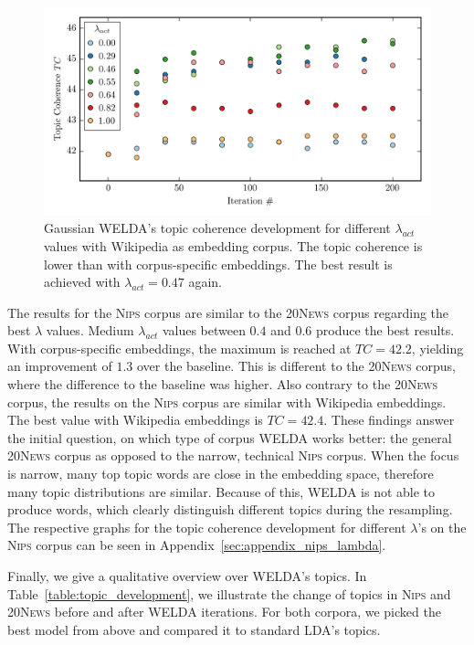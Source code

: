 \documentclass[
        a4paper,
        titlepage,
        twoside,
        parskip,
        numbers=noenddot
        ]{scrbook}
\theoremstyle{break}
\begin{document}
\begin{figure}
       \centering
       \includegraphics[width=\textwidth]{figures/welda_gaussian_lambda_200.png}
       \caption{Gaussian WELDA's topic coherence development for different $\lambda_{act}$ values with Wikipedia as embedding corpus. The topic coherence is lower than with corpus-specific embeddings. The best result is achieved with $\lambda_{act} = 0.47$ again.}
       \label{fig:welda_gaussian_lambda_200}
\end{figure}

The results for the \textsc{Nips} corpus are similar to the \textsc{20News} corpus regarding the best $\lambda$ values.
Medium $\lambda_{act}$ values between $0.4$ and $0.6$ produce the best results.
With corpus-specific embeddings, the maximum is reached at $TC = 42.2$, yielding an improvement of $1.3$ over the baseline.
This is different to the \textsc{20News} corpus, where the difference to the baseline was higher.
Also contrary to the \textsc{20News} corpus, the results on the \textsc{Nips} corpus are similar with Wikipedia embeddings.
The best value with Wikipedia embeddings is $TC = 42.4$.
These findings answer the initial question, on which type of corpus WELDA works better: the general \textsc{20News} corpus as opposed to the narrow, technical \textsc{Nips} corpus.
When the focus is narrow, many top topic words are close in the embedding space, therefore many topic distributions are similar.
Because of this, WELDA is not able to produce words, which clearly distinguish different topics during the resampling.
The respective graphs for the topic coherence development for different $\lambda$'s on the \textsc{Nips} corpus can be seen in Appendix~\ref{sec:appendix_nips_lambda}.

Finally, we give a qualitative overview over WELDA's topics.
In Table~\ref{table:topic_development}, we illustrate the change of topics in \textsc{Nips} and \textsc{20News} before and after WELDA iterations.
For both corpora, we picked the best model from above and compared it to standard LDA's topics.
\end{document}
